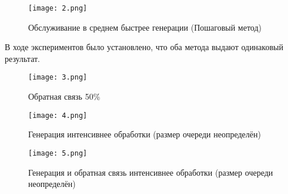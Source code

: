 	\begin{figure}[h]
		\begin{center}
			{\texttt{[image: 2.png]}
			\caption{Обслуживание в среднем быстрее генерации (Пошаговый метод)}
			\label{pic:2}}
		\end{center}
	\end{figure}

	В ходе экспериментов было установлено, что оба метода выдают одинаковый результат.
	
	\begin{figure}[h]
		\begin{center}
			{\texttt{[image: 3.png]}
			\caption{Обратная связь 50\%}
			\label{pic:3}}
		\end{center}
	\end{figure}

	\begin{figure}[h]
		\begin{center}
			{\texttt{[image: 4.png]}
			\caption{Генерация интенсивнее обработки (размер очереди неопределён)}
			\label{pic:4}}
		\end{center}
	\end{figure}

	\begin{figure}[h]
		\begin{center}
			{\texttt{[image: 5.png]}
			\caption{Генерация и обратная связь интенсивнее обработки (размер очереди неопределён)}
			\label{pic:5}}
		\end{center}
	\end{figure}